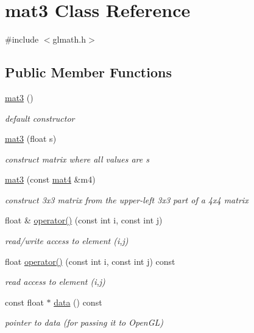 \hypertarget{classmat3}{}\section{mat3 Class Reference}
\label{classmat3}


{\ttfamily \#include $<$glmath.\+h$>$}

\subsection*{Public Member Functions}
\begin{DoxyCompactItemize}
\item 
\hyperlink{classmat3_a463027040addb1c56fe84c91b74b8d79}{mat3} ()
\begin{DoxyCompactList}\small\item\em default constructor \end{DoxyCompactList}\item 
\hyperlink{classmat3_a3448156b9da5befc4e219ac3e5e79430}{mat3} (float s)
\begin{DoxyCompactList}\small\item\em construct matrix where all values are s \end{DoxyCompactList}\item 
\hyperlink{classmat3_ae288ebcec6d9b2a7421ff61f162c6a39}{mat3} (const \hyperlink{classmat4}{mat4} \&m4)
\begin{DoxyCompactList}\small\item\em construct 3x3 matrix from the upper-\/left 3x3 part of a 4x4 matrix \end{DoxyCompactList}\item 
float \& \hyperlink{classmat3_a68a25e9a4276a0d5801d37d6e5c8523f}{operator()} (const int i, const int j)
\begin{DoxyCompactList}\small\item\em read/write access to element (i,j) \end{DoxyCompactList}\item 
float \hyperlink{classmat3_ad5d495b31140d3cbb167e5c7e233afc8}{operator()} (const int i, const int j) const 
\begin{DoxyCompactList}\small\item\em read access to element (i,j) \end{DoxyCompactList}\item 
const float $\ast$ \hyperlink{classmat3_a57c92c7e740876bba92c8854798fd848}{data} () const 
\begin{DoxyCompactList}\small\item\em pointer to data (for passing it to Open\+GL) \end{DoxyCompactList}\end{DoxyCompactItemize}
